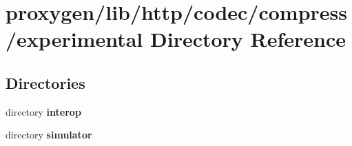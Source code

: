 \section{proxygen/lib/http/codec/compress/experimental Directory Reference}
\label{dir_59bd631e86ca68933504f30adc832f18}
\subsection*{Directories}
\begin{DoxyCompactItemize}
\item 
directory {\bf interop}
\item 
directory {\bf simulator}
\end{DoxyCompactItemize}
